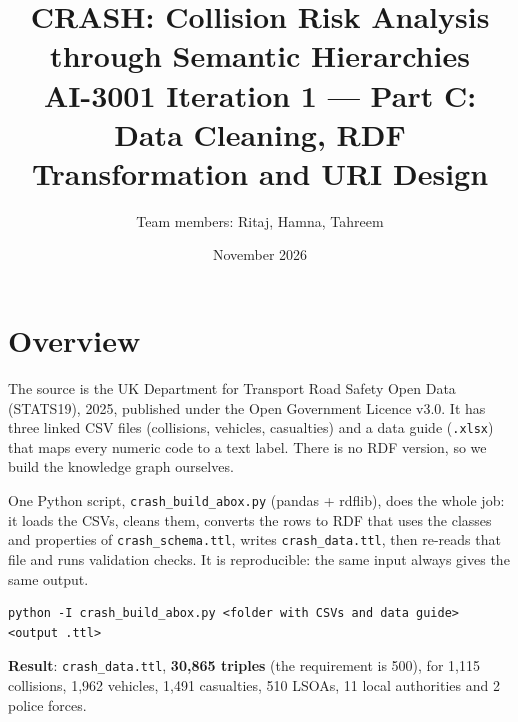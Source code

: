 \documentclass[10.5pt,a4paper]{article}
\title{CRASH: Collision Risk Analysis through Semantic Hierarchies\\[4pt]\large AI-3001 Iteration 1 --- Part C: Data Cleaning, RDF Transformation and URI Design}
\author{Team members: Ritaj, Hamna, Tahreem}\date{November 2026}
\begin{document}
\maketitle

\section{Overview}
The source is the UK Department for Transport Road Safety Open Data (STATS19), 2025, published under the Open Government Licence v3.0. It has three linked CSV files (collisions, vehicles, casualties) and a data guide (\texttt{.xlsx}) that maps every numeric code to a text label. There is no RDF version, so we build the knowledge graph ourselves.

One Python script, \texttt{crash\_build\_abox.py} (pandas + rdflib), does the whole job: it loads the CSVs, cleans them, converts the rows to RDF that uses the classes and properties of \texttt{crash\_schema.ttl}, writes \texttt{crash\_data.ttl}, then re-reads that file and runs validation checks. It is reproducible: the same input always gives the same output.
\begin{verbatim}
python -I crash_build_abox.py <folder with CSVs and data guide> <output .ttl>
\end{verbatim}

\noindent\textbf{Result}: \texttt{crash\_data.ttl}, \textbf{30,865 triples} (the requirement is 500), for 1,115 collisions, 1,962 vehicles, 1,491 casualties, 510 LSOAs, 11 local authorities and 2 police forces.
\end{document}
